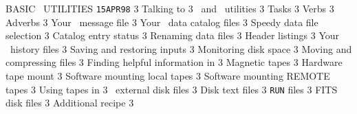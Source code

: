      {BASIC \AIPS\ UTILITIES%
}                    {{\tt 15APR98}\hskip 0.6cm 3}
   {Talking to \AIPS }                           {3}
 {\POPS\ and \AIPS\ utilities}                 {3}
 {Tasks}                                       {3}
 {Verbs}                                       {3}
 {Adverbs}                                     {3}
   {Your \AIPS\ message file}                    {3}
   {Your \AIPS\ data catalog files}              {3}
 {Speedy data file selection}                  {3}
 {Catalog entry status}                        {3}
 {Renaming data files}                         {3}
 {Header listings}                             {3}
   {Your \AIPS\ history files}                   {3}
   {Saving and restoring inputs}                 {3}
   {Monitoring disk space}                       {3}
   {Moving and compressing files}                {3}
   {Finding helpful information in \AIPS}        {3}
   {Magnetic tapes}                              {3}
 {Hardware tape mount}                         {3}
 {Software mounting local tapes}               {3}
 {Software mounting REMOTE tapes}              {3}
 {Using tapes in \AIPS}                        {3}
  {\AIPS\ external disk files}                  {3}
 {Disk text files}                            {3}
 {{\tt RUN} files}                            {3}
 {FITS disk files}                            {3}
  {Additional recipe}                           {3}
\eject

